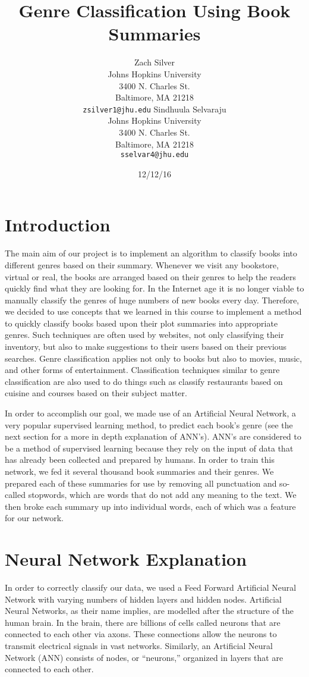 \documentclass[11pt,letterpaper]{article}
\title{Genre Classification Using Book Summaries}
\author{Zach Silver\\
  Johns Hopkins University\\
  3400 N. Charles St.\\
  Baltimore, MA 21218\\
  {\tt zsilver1@jhu.edu}
  \And
  Sindhuula Selvaraju \\
  Johns Hopkins University\\
  3400 N. Charles St.\\
  Baltimore, MA 21218\\
  {\tt sselvar4@jhu.edu}}
\date{12/12/16}
\begin{document}
\raggedbottom
\maketitle

\section{Introduction}

The main aim of our project is to implement an algorithm to classify books into different genres based on their summary. Whenever we visit any bookstore, virtual or real, the books are arranged based on their genres to help the readers quickly find what they are looking for. In the Internet age it is no longer viable to manually classify the genres of huge numbers of new books every day. Therefore, we decided to use concepts that we learned in this course to implement a method to quickly classify books based upon their plot summaries into appropriate genres. Such techniques are often used by websites, not only classifying their inventory, but also to make suggestions to their users based on their previous searches. Genre classification applies not only to books but also to movies, music, and other forms of entertainment. Classification techniques similar to genre classification are also used to do things such as classify restaurants based on cuisine and courses based on their subject matter.

In order to accomplish our goal, we made use of an Artificial Neural Network, a very popular supervised learning method, to predict each book's genre (see the next section for a more in depth explanation of ANN’s). ANN's are considered to be a method of supervised learning because they rely on the input of data that has already been collected and prepared by humans. In order to train this network, we fed it several thousand book summaries and their genres. We prepared each of these summaries for use by removing all punctuation and so-called stopwords, which are words that do not add any meaning to the text. We then broke each summary up into individual words, each of which was a feature for our network.


\section{Neural Network Explanation}

In order to correctly classify our data, we used a Feed Forward Artificial Neural Network with varying numbers of hidden layers and hidden nodes. Artificial Neural Networks, as their name implies, are modelled after the structure of the human brain. In the brain, there are billions of cells called neurons that are connected to each other via axons. These connections allow the neurons to transmit electrical signals in vast networks. Similarly, an Artificial Neural Network (ANN) consists of nodes, or “neurons,” organized in layers that are connected to each other.
\end{document}
